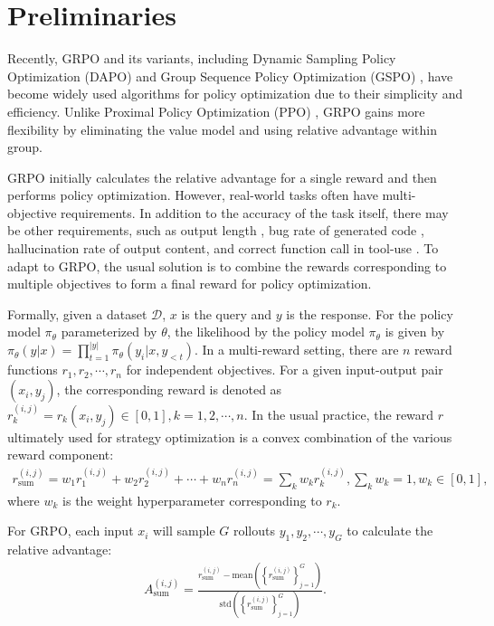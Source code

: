 \section{Preliminaries}
Recently, GRPO \citep{grpo} and its variants, including Dynamic Sampling Policy Optimization (DAPO) \citep{dapo} and Group Sequence Policy Optimization (GSPO) \citep{gspo}, have become widely used algorithms for policy optimization due to their simplicity and efficiency. Unlike Proximal Policy Optimization (PPO) \citep{ppo}, GRPO gains more flexibility by eliminating the value model and using relative advantage within group.

GRPO initially calculates the relative advantage for a single reward and then performs policy optimization. However, real-world tasks often have multi-objective requirements. In addition to the accuracy of the task itself, there may be other requirements, such as output length \citep{flashthink, liu2025learn, aggarwal2025l1}, bug rate of generated code \citep{DBLP:journals/ese/TambonDNKDA25, DBLP:conf/icsm/Gao25}, hallucination rate of output content, and correct function call in tool-use \citep{torl, logic_rl}. To adapt to GRPO, the usual solution is to combine the rewards corresponding to multiple objectives to form a final reward for policy optimization.

Formally, given a dataset $\mathcal{D}$, $x$ is the query and $y$ is the response. For the policy model $\pi_\theta$ parameterized by $\theta$, the likelihood by the policy model $\pi_\theta$ is given by $\pi_\theta(y|x) = \prod_{t=1}^{|y|}\pi_\theta(y_i | x, y_{<t})$. In a multi-reward setting, there are $n$ reward functions $r_1, r_2, \cdots, r_n$ for independent objectives. For a given input-output pair $(x_i, y_j)$, the corresponding reward is denoted as $r_k^{(i,j)} = r_k(x_i, y_j) \in [0,1], k=1,2,\cdots,n$. In the usual practice, the reward $r$ ultimately used for strategy optimization is a convex combination of the various reward component:
\begin{align}
    r_\text{sum}^{(i,j)} = w_1r_1^{(i,j)} + w_2r_2^{(i,j)} + \cdots + w_nr_n^{(i,j)} = \sum_{k} w_k r_k^{(i,j)}, \sum_k w_k = 1, w_k \in [0, 1],
\end{align}
where $w_k$ is the weight hyperparameter corresponding to $r_k$.

For GRPO, each input $x_i$ will sample $G$ rollouts $y_1, y_2, \cdots, y_G$ to calculate the relative advantage:
\begin{align}
    A_\text{sum}^{(i,j)} = \frac{r_\text{sum}^{(i,j)} - \text{mean} \left(\left\{ r_\text{sum}^{(i,j)} \right\}_{j=1}^G\right)}{\text{std} \left(\left\{ r_\text{sum}^{(i,j)} \right\}_{j=1}^G\right)}.\label{reward_combination}
\end{align}

